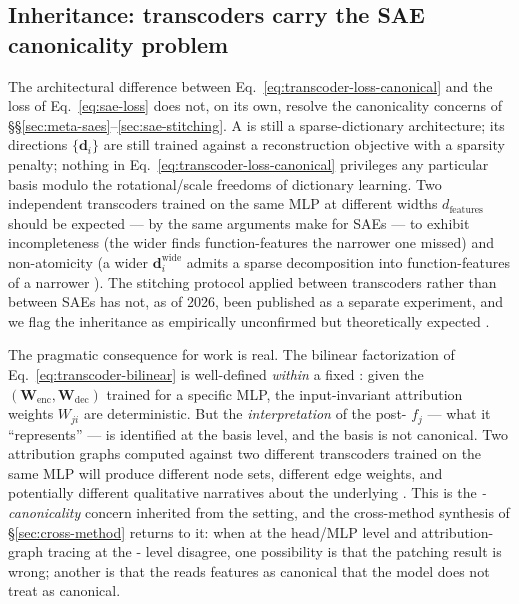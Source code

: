 \subsection{Inheritance: transcoders carry the SAE canonicality
problem}
\label{sec:transcoder-inheritance}

The architectural difference between Eq.~\eqref{eq:transcoder-loss-canonical}
and the  loss of Eq.~\eqref{eq:sae-loss} does not, on its own,
resolve the canonicality concerns of
\S\S\ref{sec:meta-saes}--\ref{sec:sae-stitching}. A  is still
a sparse-dictionary architecture; its  directions
$\{\mathbf{d}_i\}$ are still trained against a reconstruction
objective with a sparsity penalty; nothing in
Eq.~\eqref{eq:transcoder-loss-canonical} privileges any particular
basis modulo the rotational/scale freedoms of dictionary learning.
Two independent transcoders trained on the same MLP at different
widths $d_\text{features}$ should be expected --- by the same
arguments \citet{leask2025-sae-not-canonical} make for SAEs --- to
exhibit incompleteness (the wider  finds function-features
the narrower one missed) and non-atomicity (a wider 
$\mathbf{d}_i^\text{wide}$ admits a sparse decomposition into
function-features of a narrower ). The
\citet{leask2025-sae-not-canonical} stitching protocol applied between
transcoders rather than between SAEs has not, as of 2026, been
published as a separate experiment, and we flag the inheritance as
empirically unconfirmed but theoretically expected
.

The pragmatic consequence for  work is real. The bilinear
factorization of Eq.~\eqref{eq:transcoder-bilinear} is well-defined
\emph{within} a fixed : given the
$(\mathbf{W}_\text{enc}, \mathbf{W}_\text{dec})$ trained for a
specific MLP, the input-invariant attribution weights $W_{ji}$ are
deterministic. But the \emph{interpretation} of the post-
 $f_j$ --- what it ``represents'' --- is identified at the
basis level, and the basis is not canonical. Two attribution graphs
computed against two different transcoders trained on the same MLP
will produce different node sets, different edge weights, and
potentially different qualitative narratives about the underlying
. This is the \emph{-canonicality} concern inherited
from the  setting, and the cross-method synthesis of
\S\ref{sec:cross-method} returns to it: when  at
the head/MLP level and attribution-graph tracing at the -
level disagree, one possibility is that the patching result is wrong;
another is that the  reads features as canonical that
the model does not treat as canonical.

